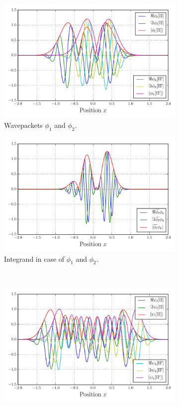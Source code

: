 \documentclass[a4paper,10pt]{article}
\begin{document}
\begin{figure}[h!]
  \begin{subfigure}[t]{0.5\linewidth}
    \includegraphics[width=\linewidth]{./fig/overlap_wavepackets.pdf}
    \caption{Wavepackets $\phi_1$ and $\phi_2$.}
    \label{fig:overlap_example_wavepackets}
  \end{subfigure}
  \begin{subfigure}[t]{0.5\linewidth}
    \includegraphics[width=\linewidth]{./fig/overlap_integrand.pdf}
    \caption{Integrand in case of $\phi_1$ and $\phi_2$.}
    \label{fig:overlap_example_integrand}
  \end{subfigure} \\
  \begin{subfigure}[t]{0.5\linewidth}
    \includegraphics[width=\linewidth]{./fig/overlap_wavepackets_2.pdf}

\end{subfigure}
\end{figure}
\end{document}
